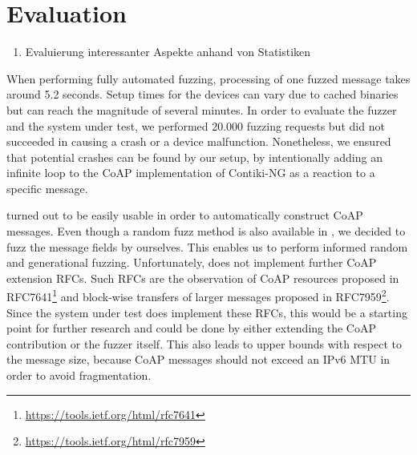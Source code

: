 \section{Evaluation}
\label{section:evaluation}

\begin{enumerate}
	\item Evaluierung interessanter Aspekte anhand von Statistiken
\end{enumerate}

When performing fully automated fuzzing, processing of one fuzzed message takes around 5.2 seconds. Setup times for the devices can vary due to cached binaries but can reach the magnitude of several minutes. In order to evaluate the fuzzer and the system under test, we performed 20.000 fuzzing requests but did not succeeded in causing a crash or a device malfunction. Nonetheless, we ensured that potential crashes can be found by our setup, by intentionally adding an infinite loop to the CoAP implementation of Contiki-NG as a reaction to a specific message.

\scapy turned out to be easily usable in order to automatically construct CoAP messages. Even though a random fuzz method is also available in \scapy, we decided to fuzz the message fields by ourselves. This enables us to perform informed random and generational fuzzing. Unfortunately, \scapy does not implement further CoAP extension RFCs. Such RFCs are the observation of CoAP resources proposed in RFC7641\footnote{\url{https://tools.ietf.org/html/rfc7641}} and block-wise transfers of larger messages proposed in RFC7959\footnote{\url{https://tools.ietf.org/html/rfc7959}}. Since the system under test does implement these RFCs, this would be a starting point for further research and could be done by either extending the \scapy CoAP contribution or the fuzzer itself. This also leads to upper bounds with respect to the message size, because CoAP messages should not exceed an IPv6 MTU in order to avoid fragmentation.
